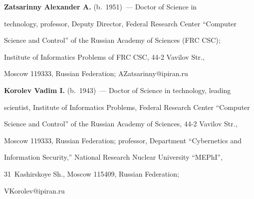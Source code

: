      

     \Contr

     

     \noindent

     \textbf{Zatsarinny Alexander A.} (b.\ 1951)~--- Doctor of Science in 

technology, professor, Deputy Director, Federal Research Center ``Computer 

Science and Control'' of the Russian Academy of Sciences (FRC CSC);

Institute of Informatics Problems of FRC CSC, 44-2 Vavilov Str., 

Moscow 119333, Russian Federation; \mbox{AZatsarinny@ipiran.ru} 



\vspace*{3pt}



\noindent

\textbf{Korolev Vadim I.} (b.\ 1943)~--- Doctor of Science in technology, leading 

scientist, Institute of Informatics Problems, Federal Research Center ``Computer 

Science and Control'' of the Russian Academy of Sciences, 44-2 Vavilov Str., 

Moscow 119333, Russian Federation; professor, Department ``Cybernetics and 

Information Security,'' National Research Nuclear University ``MEPhI'', 

31~Kashirskoye Sh., Moscow 115409, Russian Federation; 

VKorolev@ipiran.ru   

     

 \label{end\stat}





\renewcommand{\bibname}{\protect\rm Литература}

